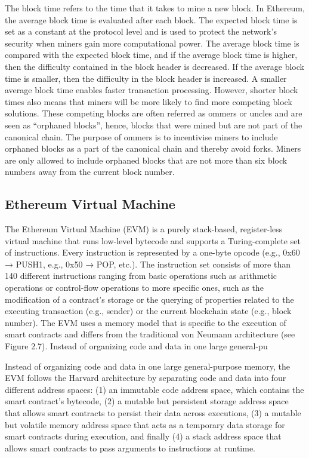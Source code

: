         The block time refers to the time that it takes to mine a new block.
        In Ethereum, the average block time is evaluated after each block.
        The expected block time is set as a constant at the protocol level and is used to protect the network's security when miners gain more computational power.
        The average block time is compared with the expected block time, and if the average block time is higher, then the difficulty contained in the block header is decreased.
        If the average block time is smaller, then the difficulty in the block header is increased.
        A smaller average block time enables faster transaction processing.
        However, shorter block times also means that miners will be more likely to find more competing block solutions.
        These competing blocks are often referred as ommers or uncles and are seen as “orphaned blocks”, hence, blocks that were mined but are not part of the canonical chain.
        The purpose of ommers is to incentivise miners to include orphaned blocks as a part of the canonical chain and thereby avoid forks.
        Miners are only allowed to include orphaned blocks that are not more than six block numbers away from the current block number.

    \subsection{Ethereum Virtual Machine}
        The Ethereum Virtual Machine (EVM) is a purely stack-based, register-less virtual machine that runs low-level bytecode and supports a Turing-complete set of instructions.
        Every instruction is represented by a one-byte opcode (e.g., 0x60 → PUSH1, e.g., 0x50 → POP, etc.).
        The instruction set consists of more than 140 different instructions ranging from basic operations such as arithmetic operations or control-flow operations to more specific ones, such as the modification of a contract's storage or the querying of properties related to the executing transaction (e.g., sender) or the current blockchain state (e.g., block number).
        The EVM uses a memory model that is specific to the execution of smart contracts and differs from the traditional von Neumann architecture (see Figure 2.7). Instead of organizing code and data in one large general-pu

        Instead of organizing code and data in one large general-purpose memory, the EVM follows the Harvard architecture by separating code and data into four different address spaces: (1) an immutable code address space, which contains the smart contract's bytecode, (2) a mutable but persistent storage address space that allows smart contracts to persist their data across executions, (3) a mutable but volatile memory address space that acts as a temporary data storage for smart contracts during execution, and finally (4) a stack address space that allows smart contracts to pass arguments to instructions at runtime.

